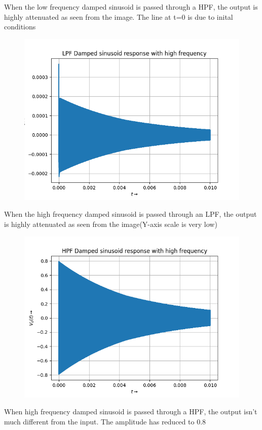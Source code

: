 \documentclass[12pt, a4paper]{article}
\begin{document}
\begin{center}
    When the low frequency damped sinusoid is passed through a HPF, the output is highly attenuated as seen from the image. The line at t=0 is due to inital conditions
\end{center}
\vspace*{-0.5cm}
\begin{figure}[H]
    \centering
    \includegraphics[scale = 0.8]{Figure_9.png}
    \label{fig:sample}
\end{figure}
\begin{center}
    When the high frequency damped sinusoid is passed through an LPF, the output is highly attenuated as seen from the image(Y-axis scale is very low)
\end{center}
\vspace*{-0.5cm}
\begin{figure}[H]
    \centering
    \includegraphics[scale = 0.8]{Figure_10.png}
    \label{fig:sample}
\end{figure}
\begin{center}
    When high frequency damped sinusoid is passed through a HPF, the output isn't much different from the input. The amplitude has reduced to 0.8
\end{center}
\end{document}
